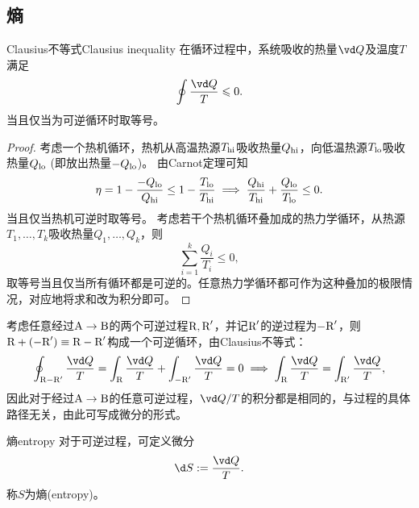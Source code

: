 
\subsection{熵}

\begin{theorem}{Clausius不等式}{Clausius inequality}
	在循环过程中，系统吸收的热量$\vd Q$及温度$T$满足
	\begin{equation}
		\oint\frac{\vd Q}T\leqslant 0.
	\end{equation}
	当且仅当为可逆循环时取等号。
\end{theorem}

\begin{proof}
	考虑一个热机循环，热机从高温热源$T_{\mathrm{hi}}$吸收热量$Q_{\mathrm{hi}}$，向低温热源$T_{\mathrm{lo}}$吸收热量$Q_{\mathrm{lo}}$ (即放出热量$-Q_{\mathrm{lo}}$)。
	由Carnot定理可知
	\[
		\eta=1-\frac{-Q_{\mathrm{lo}}}{Q_{\mathrm{hi}}}\leq1-\frac{T_{\mathrm{lo}}}{T_{\mathrm{hi}}}
		\implies
		\frac{Q_{\mathrm{hi}}}{T_{\mathrm{hi}}}+\frac{Q_{\mathrm{lo}}}{T_{\mathrm{lo}}}\leq 0.
	\]
	当且仅当热机可逆时取等号。
	考虑若干个热机循环叠加成的热力学循环，从热源$T_1,\ldots,T_k$吸收热量$Q_1,\ldots,Q_k$，则
	\[
		\sum_{i=1}^k\frac{Q_i}{T_i}\leq 0,
	\]
	取等号当且仅当所有循环都是可逆的。任意热力学循环都可作为这种叠加的极限情况，对应地将求和改为积分即可。
\end{proof}

\begin{corollary}
	考虑任意经过$\text A\to\text B$的两个可逆过程$\text R,\text R'$，并记$\text R'$的逆过程为$-\text R'$，则$\text R+(-\text R')\equiv\text R-\text R'$构成一个可逆循环，由Clausius不等式：
	\[
		\oint_{\text R-\text R'}\frac{\vd Q}T=\int_\text R\frac{\vd Q}T+\int_{-\text R'}\frac{\vd Q}T=0\implies
		\int_\text R\frac{\vd Q}T=\int_{\text R'}\frac{\vd Q}T,
	\]
	因此对于经过$\text A\to\text B$的任意可逆过程，$\vd Q/T$的积分都是相同的，与过程的具体路径无关，由此可写成微分的形式。
\end{corollary}

\begin{definition}
	{熵}{entropy}
	对于可逆过程，可定义微分
	\begin{equation}
		\label{eqn:dS=dQ/T}
		\d S:=\frac{\vd Q}T.
	\end{equation}
	称$S$为熵(entropy)。
\end{definition}


